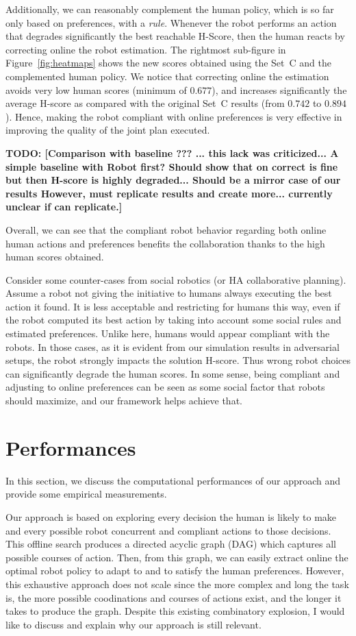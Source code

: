 Additionally, we can reasonably complement the human policy, which is so far only based on preferences, with a \textit{rule}. Whenever the robot performs an action that degrades significantly the best reachable H-Score, then the human reacts by correcting online the robot estimation.
The rightmost sub-figure in Figure~\ref{fig:heatmaps} shows the new scores obtained using the Set~C and the complemented human policy. 
We notice that correcting online the estimation avoids very low human scores (minimum of $0.677$), and increases significantly the average H-score as compared with the original Set~C results (from $0.742$ to $0.894$). Hence, making the robot compliant with online preferences is very effective in improving the quality of the joint plan executed.

\textbf{TODO: [Comparison with baseline ??? ... this lack was criticized... A simple baseline with Robot first? Should show that on correct is fine but then H-score is highly degraded... Should be a mirror case of our results However, must replicate results and create more... currently unclear if can replicate.]}

Overall, we can see that the compliant robot behavior regarding both online human actions and preferences benefits the collaboration thanks to the high human scores obtained.

Consider some counter-cases from social robotics (or HA collaborative planning). Assume a robot not giving the initiative to humans always executing the best action it found. 
It is less acceptable and restricting for humans this way, even if the robot computed its best action by taking into account some social rules and estimated preferences. 
Unlike here, humans would appear compliant with the robots. 
In those cases, as it is evident from our simulation results in adversarial setups, the robot strongly impacts the solution H-score. Thus wrong robot choices can significantly degrade the human scores. In some sense, being compliant and adjusting to online preferences can be seen as some social factor that robots should maximize, and our framework helps achieve that.

\section{Performances}


In this section, we discuss the computational performances of our approach and provide some empirical measurements. 

Our approach is based on exploring every decision the human is likely to make and every possible robot concurrent and compliant actions to those decisions. 
This offline search produces a directed acyclic graph (DAG) which captures all possible courses of action. Then, from this graph, we can easily extract online the optimal robot policy to adapt to and to satisfy the human preferences. However, this exhaustive approach does not scale since the more complex and long the task is, the more possible coodinations and courses of actions exist, and the longer it takes to produce the graph. Despite this existing combinatory explosion, I would like to discuss and explain why our approach is still relevant.

